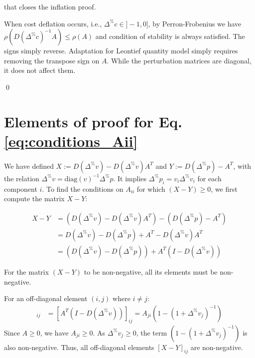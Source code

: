 \documentclass{article}
\begin{document}
\noindent that closes the inflation proof. 

\vspace{0.1cm}

When cost deflation occurs, i.e., $\Delta^{\%} c \in ]-1,0]$, by Perron-Frobenius we have $\rho(D(\Delta^{\%} c)^{-1}A) \leq \rho(A)$ and condition of stability is always satisfied. The signs simply reverse. Adaptation for Leontief quantity model simply requires removing the transpose sign on $A$. While the perturbation matrices are diagonal, it does not affect them. 

\qed

\section{Elements of proof for Eq. \eqref{eq:conditions_Aii}}
\label{appendix:proof_conditions_Aii}

We have defined $X := D(\Delta^{\%} v) - D(\Delta^{\%} v) A^T$ and $Y := D(\Delta^{\%} p) - A^T$, with the relation $\Delta^{\%} v= \text{diag}(v)^{-1} \Delta^{\%} p$. It implies $\Delta^{\%} p_i = v_i \Delta^{\%} v_i$ for each component $i$. To find the conditions on $A_{ii}$ for which $(X-Y) \geq 0$, we first compute the matrix $X-Y$:

\begin{align*}
    X - Y &= \left(D(\Delta^{\%} v) - D(\Delta^{\%} v) A^T\right) - \left(D(\Delta^{\%} p) - A^T\right) \\
    &= D(\Delta^{\%} v) - D(\Delta^{\%} p) + A^T - D(\Delta^{\%} v) A^T \\
    &= (D(\Delta^{\%} v) - D(\Delta^{\%} p)) + A^T(I - D(\Delta^{\%} v))
\end{align*}

\noindent For the matrix $(X-Y)$ to be non-negative, all its elements must be non-negative.

\vspace{0.1cm}

For an off-diagonal element $(i, j)$ where $i \neq j$:
\begin{align*}
    [X-Y]_{ij} &= [A^T(I - D(\Delta^{\%} v))]_{ij} = A_{ji} \left(1 - (1 + \Delta^{\%} v_j)^{-1}\right)
\end{align*}
Since $A \geq 0$, we have $A_{ji} \geq 0$. As $\Delta^{\%} v_j \geq 0$, the term $\left(1 - (1 + \Delta^{\%} v_j)^{-1}\right)$ is also non-negative. Thus, all off-diagonal elements $[X-Y]_{ij}$ are non-negative.

\vspace{0.1cm}
\end{document}
